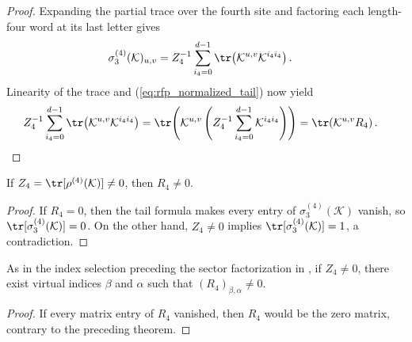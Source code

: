 \begin{proof}
    \leanok
    Expanding the partial trace over the fourth site and factoring each
    length-four word at its last letter gives
    \begin{align}
        \sigma_3^{(4)}(\mathcal K)_{u,v}
         & =Z_4^{-1}\sum_{i_4=0}^{d-1}
        \tr\!\left(\mathcal K^{u,v}\mathcal K^{i_4i_4}\right).
        \notag
    \end{align}
    Linearity of the trace and (\ref{eq:rfp_normalized_tail}) now yield
    \begin{align}
        Z_4^{-1}\sum_{i_4=0}^{d-1}
        \tr\!\left(\mathcal K^{u,v}\mathcal K^{i_4i_4}\right)
         & =\tr\!\left(\mathcal K^{u,v}
        \left(Z_4^{-1}\sum_{i_4=0}^{d-1}\mathcal K^{i_4i_4}\right)\right)
        =\tr\!\left(\mathcal K^{u,v}R_4\right).
        \notag
    \end{align}
\end{proof}

\begin{lemma}
    \label{thm:mpdo_normalized_four_site_tail_ne_zero}
    \leanok
    If $Z_4=\tr[\rho^{(4)}(\mathcal K)]\ne0$, then $R_4\ne0$.
\end{lemma}

\begin{proof}
    \leanok
    If $R_4=0$, then the tail formula makes every entry of
    $\sigma_3^{(4)}(\mathcal K)$ vanish, so
    $\tr[\sigma_3^{(4)}(\mathcal K)]=0$. On the other hand, $Z_4\ne0$ implies
    $\tr[\sigma_3^{(4)}(\mathcal K)]=1$, a contradiction.
\end{proof}

\begin{lemma}
    \label{thm:mpdo_normalized_four_site_tail_entry_ne_zero}
    \leanok
    As in the index selection preceding the sector factorization in
    \cite[Appendix~C.2, lines~1431--1437]{Cirac2016MPDO_arXiv}, if $Z_4\ne0$,
    there exist virtual indices $\beta$ and $\alpha$ such that
    $(R_4)_{\beta,\alpha}\ne0$.
\end{lemma}

\begin{proof}
    \leanok
    If every matrix entry of $R_4$ vanished, then $R_4$ would be the zero
    matrix, contrary to the preceding theorem.
\end{proof}

